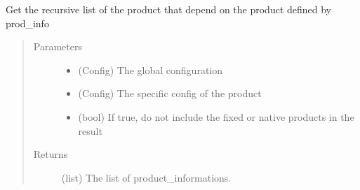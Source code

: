 \documentclass[a4paper,10pt,english]{sphinxmanual}
\begin{document}

\begin{fulllineitems}
\label{\detokenize{apidoc_commands/commands:commands.compile.get_recursive_children}}
Get the recursive list of the product that depend on 
the product defined by prod\_info
\begin{quote}\begin{description}
\item[{Parameters}] \leavevmode\begin{itemize}
\item {} 
 \textendash{} (Config) The global configuration

\item {} 
 \textendash{} (Config) The specific config of the product

\item {} 
 \textendash{} (bool) 
If true, do not include the fixed or native products in the result

\end{itemize}

\item[{Returns}] \leavevmode
(list) The list of product\_informations.

\end{description}\end{quote}

\end{fulllineitems}

\end{document}
